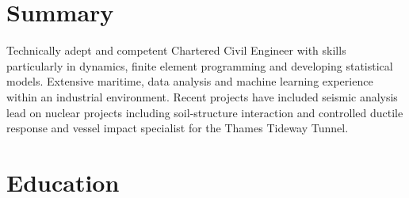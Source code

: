 \documentclass[letterpaper]{twentysecondcv} %
\begin{document}
\makeprofile %

\section{Summary}

Technically adept and competent Chartered Civil Engineer with skills particularly in dynamics, finite element programming and developing statistical models. 
Extensive maritime, data analysis and machine learning experience within an industrial environment. Recent projects have included seismic analysis lead on nuclear projects including soil-structure interaction and controlled ductile response and vessel impact specialist for the Thames Tideway Tunnel. 

\section{Education}
\end{document}
